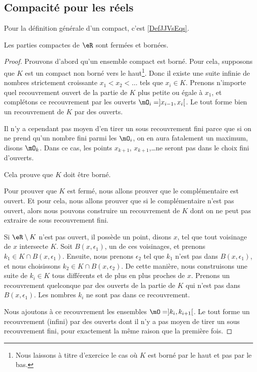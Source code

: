 \subsection{Compacité pour les réels}

Pour la définition générale d'un compact, c'est \ref{DefJJVsEqs}.

\begin{proposition}     \label{PROPooBFSAooKSugMj}
    Les parties compactes de \( \eR\) sont fermées et bornées.
\end{proposition}

\begin{proof}
Prouvons d'abord qu'un ensemble compact est borné. Pour cela, supposons que $K$ est un compact non borné vers le haut\footnote{Nous laissons à titre d'exercice le cas où $K$ est borné par le haut et pas par le bas.}. Donc il existe une suite infinie de nombres strictement croissante $x_1<x_2<\ldots$ tels que $x_i\in K$. Prenons n'importe quel recouvrement ouvert de la partie de $K$ plus petite ou égale à $x_1$, et complétons ce recouvrement par les ouverts $\mO_i=]x_{i-1},x_i[$. Le tout forme bien un recouvrement de $K$ par des ouverts.

Il n'y a cependant pas moyen d'en tirer un sous recouvrement fini parce que si on ne prend qu'un nombre fini parmi les $\mO_i$, on en aura fatalement un maximum, disons $\mO_k$. Dans ce cas, les points $x_{k+1}$, $x_{k+1}$,\ldots ne seront pas dans le choix fini d'ouverts.

Cela prouve que $K$ doit être borné.

Pour prouver que $K$ est fermé, nous allons prouver que le complémentaire est ouvert. Et pour cela, nous allons prouver que si le complémentaire n'est pas ouvert, alors nous pouvons construire un recouvrement de $K$ dont on ne peut pas extraire de sous recouvrement fini.

Si $\eR\setminus K$ n'est pas ouvert, il possède un point, disons $x$, tel que tout voisinage de $x$ intersecte $K$. Soit $B(x,\epsilon_1)$, un de ces voisinages, et prenons $k_1\in K\cap B(x,\epsilon_1)$. Ensuite, nous prenons $\epsilon_2$ tel que $k_1$ n'est pas dans $B(x,\epsilon_1)$, et nous choisissons $k_2\in K\cap B(x,\epsilon_2)$. De cette manière, nous construisons une suite de $k_i\in K$ tous différents et de plus en plus proches de $x$. Prenons un recouvrement quelconque par des ouverts de la partie de $K$ qui n'est pas dans $B(x,\epsilon_1)$. Les nombres $k_i$ ne sont pas dans ce recouvrement.

Nous ajoutons à ce recouvrement les ensembles $\mO=]k_i,k_{i+1}[$. Le tout forme un recouvrement (infini) par des ouverts dont il n'y a pas moyen de tirer un sous recouvrement fini, pour exactement la même raison que la première fois.
\end{proof}

